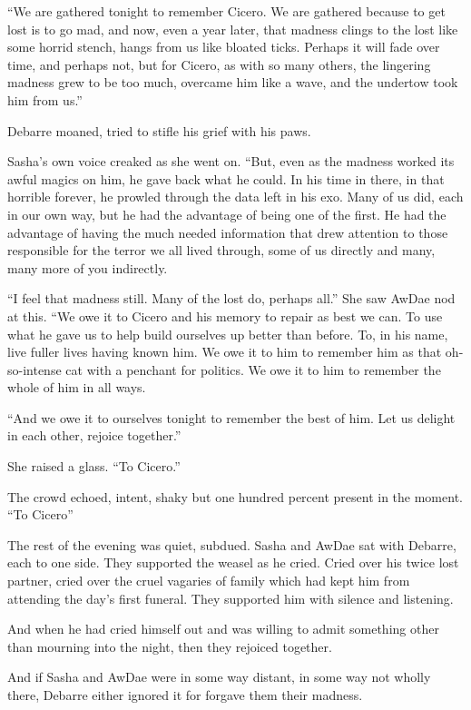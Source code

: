 ``We are gathered tonight to remember Cicero. We are gathered because to get lost is to go mad, and now, even a year later, that madness clings to the lost like some horrid stench, hangs from us like bloated ticks. Perhaps it will fade over time, and perhaps not, but for Cicero, as with so many others, the lingering madness grew to be too much, overcame him like a wave, and the undertow took him from us.''

Debarre moaned, tried to stifle his grief with his paws.

Sasha's own voice creaked as she went on. ``But, even as the madness worked its awful magics on him, he gave back what he could. In his time in there, in that horrible forever, he prowled through the data left in his exo. Many of us did, each in our own way, but he had the advantage of being one of the first. He had the advantage of having the much needed information that drew attention to those responsible for the terror we all lived through, some of us directly and many, many more of you indirectly.

``I feel that madness still. Many of the lost do, perhaps all.'' She saw AwDae nod at this. ``We owe it to Cicero and his memory to repair as best we can. To use what he gave us to help build ourselves up better than before. To, in his name, live fuller lives having known him. We owe it to him to remember him as that oh-so-intense cat with a penchant for politics. We owe it to him to remember the whole of him in all ways.

``And we owe it to ourselves tonight to remember the best of him. Let us delight in each other, rejoice together.''

She raised a glass. ``To Cicero.''

The crowd echoed, intent, shaky but one hundred percent present in the moment. ``To Cicero''

The rest of the evening was quiet, subdued. Sasha and AwDae sat with Debarre, each to one side. They supported the weasel as he cried. Cried over his twice lost partner, cried over the cruel vagaries of family which had kept him from attending the day's first funeral. They supported him with silence and listening.

And when he had cried himself out and was willing to admit something other than mourning into the night, then they rejoiced together.

And if Sasha and AwDae were in some way distant, in some way not wholly there, Debarre either ignored it for forgave them their madness.
